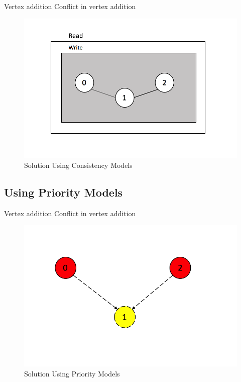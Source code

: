 \begin{frame}{Vertex addition}
	Conflict in vertex addition
			\begin{figure}
			\includegraphics[width=0.6\linewidth]{figures/vnode1.png}
			\caption{Solution Using Consistency Models}
			\end{figure}
\end{frame}

\subsection{Using Priority Models}
\begin{frame}{Vertex addition}
	Conflict in vertex addition
			\begin{figure}
			\includegraphics[width=0.6\linewidth]{figures/priority1.png}
			\caption{Solution Using Priority Models}
			\end{figure}
\end{frame}

